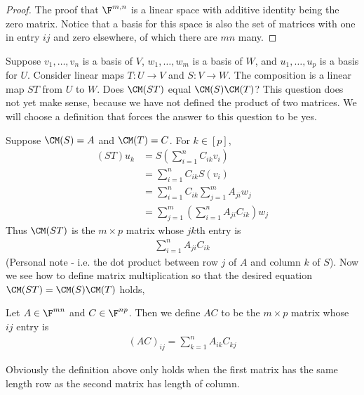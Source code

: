 \documentclass{article}
\begin{document}
  \begin{proof}
    The proof that $\F^{m, n}$ is a linear space with additive identity being the zero matrix. Notice that a basis for this space is also the set of matrices with one in entry $ij$ and zero
    elsewhere, of which there are $mn$ many.
  \end{proof}
  Suppose $v_1, \dots, v_n$ is a basis of $V$, $w_1, \dots, w_m$ is a basis of $W$, and $u_1, \dots, u_p$ is a basis for $U$. Consider linear maps $T: U \to V$ and $S: V \to W$. The
  composition is a linear map $ST$ from $U$ to $W$. Does $\CM(ST)$ equal $\CM(S)\CM(T)$? This question does not yet make sense, because we have not defined the product of two matrices. We
  will choose a definition that forces the answer to this question to be yes.

  Suppose $\CM(S) = A$ and $\CM(T) = C$. For $k \in [p]$,
  \begin{align*}
    (ST)u_k & = S(\sum_{i = 1}^{n}C_{ik}v_i) \\
    & = \sum_{i = 1}^{n}C_{ik}S(v_i) \\
    & = \sum_{i = 1}^{n}C_{ik}\sum_{j = 1}^{m}A_{ji}w_{j} \\
    & = \sum_{j = 1}^{m}(\sum_{i = 1}^{n}A_{ji}C_{ik})w_j
  \end{align*}
  Thus $\CM(ST)$ is the $m\times p$ matrix whose $jk$th entry is
  \begin{align*}
    \sum_{i = 1}^{n}A_{ji}C_{ik}
  \end{align*}
  (Personal note - i.e. the dot product between row $j$ of $A$ and column $k$ of $S$). Now we see how to define matrix multiplication so that the desired equation $\CM(ST) = \CM(S)\CM(T)$
  holds,
  \begin{defn}
    Let $A \in \F^{mn}$ and $C \in \F^{np}$. Then we define $AC$ to be the $m\times p$ matrix whose $ij$ entry is
    \begin{align*}
      (AC)_{ij} = \sum_{k = 1}^{n}A_{ik}C_{kj}
    \end{align*}
  \end{defn}
  Obviously the definition above only holds when the first matrix has the same length row as the second matrix has length of column.
\end{document}
